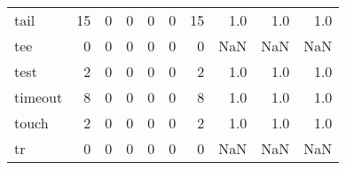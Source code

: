 \begin{longtable}{lrrrrrrrrr}
tail      &                                                 15 &                                                  0 &                                                  0 &                                                  0 &                                                  0 &                                                 15 &                                                1.0 &                                    1.0 &                                  1.0 \\
tee       &                                                  0 &                                                  0 &                                                  0 &                                                  0 &                                                  0 &                                                  0 &                                                NaN &                                    NaN &                                  NaN \\
test      &                                                  2 &                                                  0 &                                                  0 &                                                  0 &                                                  0 &                                                  2 &                                                1.0 &                                    1.0 &                                  1.0 \\
timeout   &                                                  8 &                                                  0 &                                                  0 &                                                  0 &                                                  0 &                                                  8 &                                                1.0 &                                    1.0 &                                  1.0 \\
touch     &                                                  2 &                                                  0 &                                                  0 &                                                  0 &                                                  0 &                                                  2 &                                                1.0 &                                    1.0 &                                  1.0 \\
tr        &                                                  0 &                                                  0 &                                                  0 &                                                  0 &                                                  0 &                                                  0 &                                                NaN &                                    NaN &                                  NaN \\

\end{longtable}
